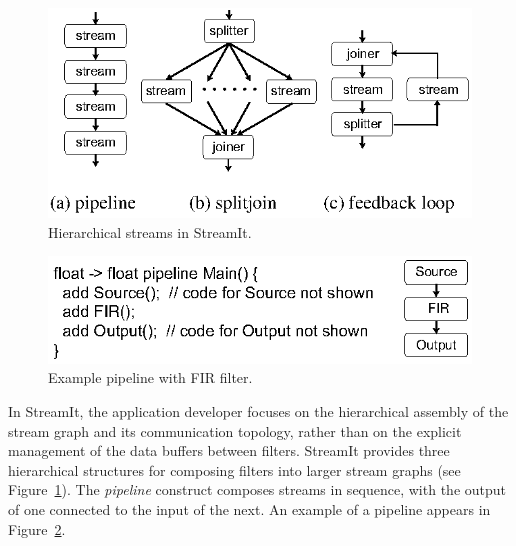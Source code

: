 \documentclass{sigplanconf}
\begin{document}
\begin{figure}[t]
\begin{center}
 \includegraphics[scale=1, angle=0]{./constructs-eg.eps}
 \caption{Hierarchical streams in StreamIt.}
 \label{fig:containers}
\end{center}
\end{figure}

\begin{figure}[t]
\begin{center}
\vspace{-12pt}
 \includegraphics[scale=1, angle=0]{./pipeline-eg.eps}
 \caption{Example pipeline with FIR filter.}
 \label{fig:pipeline}
\end{center}
\end{figure}

In StreamIt, the
application developer focuses on the hierarchical assembly of the
stream graph and its communication topology, rather than on the 
explicit management of the data buffers between filters.
StreamIt provides three hierarchical structures for composing filters
into larger stream graphs (see Figure~\ref{fig:containers}). The 
{\it pipeline} construct composes streams in sequence, with the output
of one connected to the input of the next.   An example of a pipeline
appears in Figure~\ref{fig:pipeline}.
\end{document}

